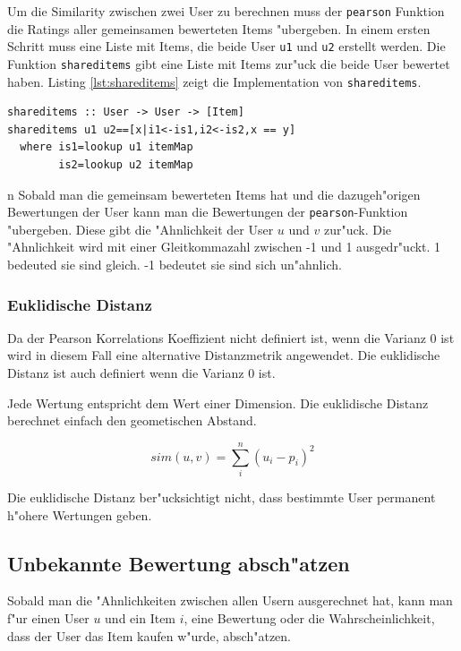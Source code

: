 \documentclass[a4paper, 12pt]{article}
\begin{document}
Um die Similarity zwischen zwei User zu berechnen muss der \verb|pearson| Funktion die Ratings aller gemeinsamen bewerteten Items "ubergeben. In einem ersten Schritt muss eine Liste mit Items, die beide User \verb|u1| und \verb|u2| erstellt werden. Die Funktion \verb|shareditems| gibt eine Liste mit Items zur"uck die beide User bewertet haben. Listing \ref{lst:shareditems} zeigt die Implementation von \verb|shareditems|.

\begin{lstlisting}[caption=shareditems, label=lst:shareditems]
shareditems :: User -> User -> [Item]
shareditems u1 u2==[x|i1<-is1,i2<-is2,x == y]
  where is1=lookup u1 itemMap
        is2=lookup u2 itemMap
\end{lstlisting}
n
Sobald man die gemeinsam bewerteten Items hat und die dazugeh"origen Bewertungen der User kann man die Bewertungen der \verb|pearson|-Funktion "ubergeben. Diese gibt die "Ahnlichkeit der User $u$ und $v$ zur"uck. Die "Ahnlichkeit wird mit einer Gleitkommazahl zwischen -1 und 1 ausgedr"uckt. 1 bedeuted sie sind gleich. -1 bedeutet sie sind sich un"ahnlich.

\subsubsection{Euklidische Distanz}
\label{sec:euclid}

Da der Pearson Korrelations Koeffizient nicht definiert ist, wenn die Varianz 0 ist wird in diesem Fall eine alternative Distanzmetrik angewendet. Die euklidische Distanz ist auch definiert wenn die Varianz 0 ist.

Jede Wertung entspricht dem Wert einer Dimension. Die euklidische Distanz berechnet einfach den geometischen Abstand.

\begin{equation}
  \label{eq:euclid}
 sim(u,v) = \sum_i^n (u_i - p_i )^2
\end{equation}

Die euklidische Distanz ber"ucksichtigt nicht, dass bestimmte User permanent h"ohere Wertungen geben.

\subsection{Unbekannte Bewertung absch"atzen}
\label{sec:compp}

Sobald man die "Ahnlichkeiten zwischen allen Usern ausgerechnet hat, kann man f"ur einen User $u$ und ein Item $i$, eine Bewertung oder die Wahrscheinlichkeit, dass der User das Item kaufen w"urde, absch"atzen.
\end{document}
